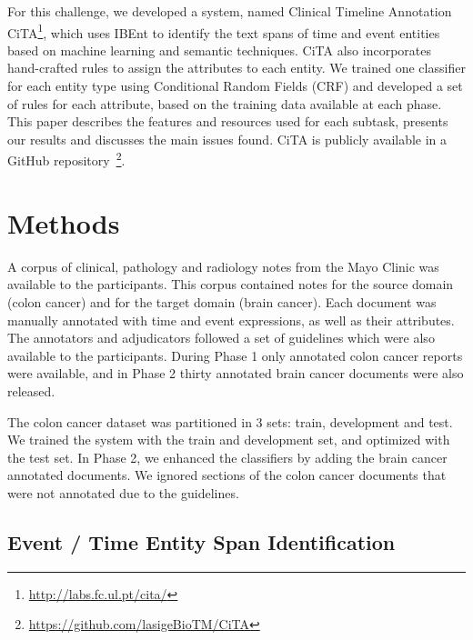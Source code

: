 \documentclass[11pt,a4paper]{article}
\begin{document}
For this challenge, we developed a system, named Clinical Timeline Annotation CiTA\footnote{\url{http://labs.fc.ul.pt/cita/}}, which uses IBEnt \cite{Lamurias2015} to identify the text spans of time and event entities based on machine learning and semantic techniques. CiTA also incorporates hand-crafted rules to assign the attributes to each entity.
We trained one classifier for each entity type using Conditional Random Fields (CRF) and developed a set of rules for each attribute, based on the training data available at each phase.
This paper describes the features and resources used for each subtask, presents our results and discusses the main issues found. CiTA is publicly available in a GitHub repository~\footnote{\url{https://github.com/lasigeBioTM/CiTA}}.

\section{Methods}


A corpus of clinical, pathology and radiology notes from the Mayo Clinic was available to the participants.
This corpus contained notes for the source domain (colon cancer) and for the target domain (brain cancer).
Each document was manually annotated with time and event expressions, as well as their attributes.
The annotators and adjudicators followed a set of guidelines which were also available to the participants.
During Phase 1 only annotated colon cancer reports were available,
and in Phase 2 thirty annotated brain cancer documents were also released.


The colon cancer dataset was partitioned in 3 sets: train, development and test.
We trained the system with the train and development set, and optimized with the test set.
In Phase 2, we enhanced the classifiers by adding the brain cancer annotated documents.
We ignored sections of the colon cancer documents that were not annotated due to the guidelines.


\subsection{Event / Time Entity Span Identification}
\end{document}
